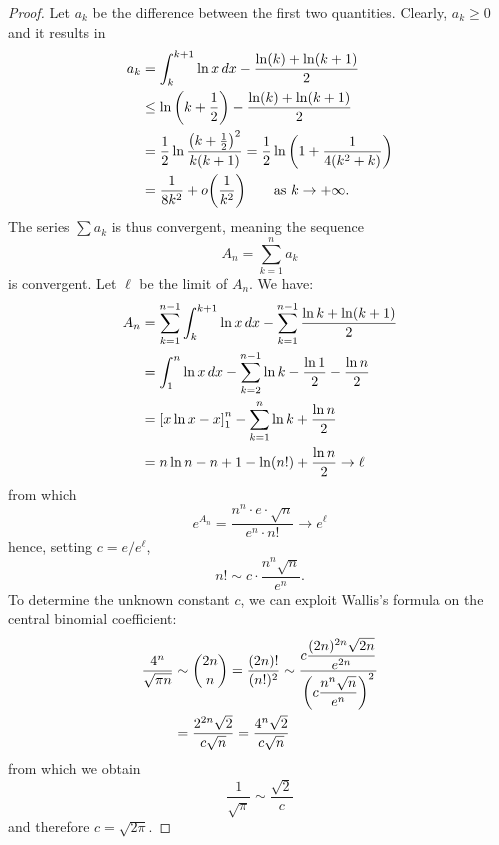 \begin{proof}
Let $a_k$ be the difference between the first two quantities.
Clearly, $a_k\ge 0$
and it results in
\begin{align*}
a_k
 &= \int_k^{k+1} \ln x\, dx - \frac{\ln (k) + \ln(k+1)}{2}\\
 & \le \ln{\left( k+\frac 1 2 \right)} - \frac{\ln(k) + \ln(k+1)}{2} \\
 & = \frac 1 2 \ln\frac{{\left( k+\frac 1 2 \right)}^2}{k(k+1)}
  = \frac 1 2 \ln{\left( 1+\frac{1}{4(k^2+k)} \right)}\\
 & = \frac 1 {8k^2} + o{\left( \frac 1 {k^2} \right)}
 \qquad \text{as $k\to+\infty$.}
\end{align*}
The series $\sum a_k$ is thus convergent, meaning the sequence
\[
  A_n = \sum_{k=1}^n a_k
\]
is convergent. Let $\ell$ be the limit of $A_n$. We have:
\begin{align*}
A_n
&= \sum_{k=1}^{n-1} \int_{k}^{k+1} \ln x\, dx -
\sum_{k=1}^{n-1} \frac{\ln k + \ln(k+1)}{2} \\
&= \int_{1}^{n} \ln x\, dx - \sum_{k=2}^{n-1} \ln k - \frac{\ln 1}{2}
-\frac{\ln n}{2} \\
&= {\left[  x \ln x -x \right]}_1^n
- \sum_{k=1}^n \ln k + \frac{\ln n}{2} \\
&= n \ln n - n + 1 - \ln(n!) + \frac {\ln n}{2} \to \ell
 \end{align*}
from which
\[
e^{A_n} = \frac{n^n\cdot e \cdot \sqrt{n}}{e^n \cdot n!} \to e^\ell
\]
hence, setting $c=e/e^\ell$,
\[
  n! \sim c\cdot\frac{n^n \sqrt{n}}{e^n}.
\]
To determine the unknown constant $c$, we can exploit Wallis's formula on the
central binomial coefficient:
\begin{align*}
\frac{4^n}{\sqrt{\pi n}}
 &\sim
{2n \choose n}
= \frac{(2n)!}{(n!)^2}
\sim \frac{\displaystyle c \frac{(2n)^{2n}\sqrt{2n}}{e^{2n}}}
{\displaystyle{\left( c\frac{n^n\sqrt n}{e^n} \right)}^2} \\
&= \frac{2^{2n}\sqrt{2}}{c\sqrt{n}}
= \frac{4^n \sqrt 2}{c\sqrt n}
\end{align*}
from which we obtain
\[
  \frac{1}{\sqrt \pi} \sim \frac{\sqrt 2}{c}
\]
and therefore $c=\sqrt{2\pi}$.
\end{proof}